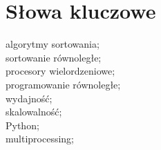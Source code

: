 \cleardoublepage
\chapter*{Słowa kluczowe}

algorytmy sortowania;\\
sortowanie równoległe;\\
procesory wielordzeniowe;\\
programowanie równoległe;\\
wydajność;\\
skalowalność;\\
Python;\\
multiprocessing;\\